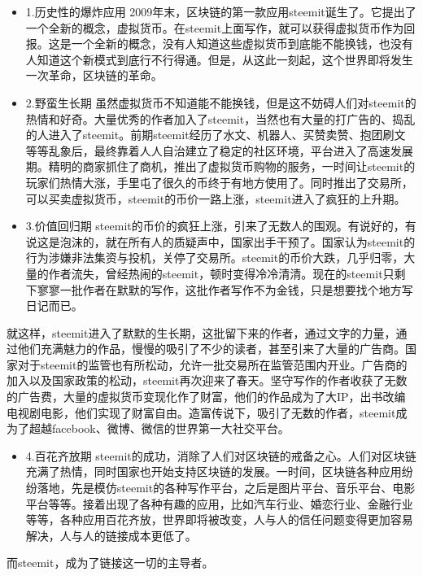 \documentclass[]{ctexbook}
\providecommand{\tightlist}{%
  \setlength{\itemsep}{0pt}\setlength{\parskip}{0pt}}
\begin{document}
\begin{itemize}
\item
  1.历史性的爆炸应用
  2009年末，区块链的第一款应用steemit诞生了。它提出了一个全新的概念，虚拟货币。在steemit上面写作，就可以获得虚拟货币作为回报。这是一个全新的概念，没有人知道这些虚拟货币到底能不能换钱，也没有人知道这个新模式到底行不行得通。但是，从这此一刻起，这个世界即将发生一次革命，区块链的革命。
\item
  2.野蛮生长期
  虽然虚拟货币不知道能不能换钱，但是这不妨碍人们对steemit的热情和好奇。大量优秀的作者加入了steemit，当然也有大量的打广告的、捣乱的人进入了steemit。前期steemit经历了水文、机器人、买赞卖赞、抱团刷文等等乱象后，最终靠着人人自治建立了稳定的社区环境，平台进入了高速发展期。精明的商家抓住了商机，推出了虚拟货币购物的服务，一时间让steemit的玩家们热情大涨，手里屯了很久的币终于有地方使用了。同时推出了交易所，可以买卖虚拟货币，steemit的币价一路上涨，steemit进入了疯狂的上升期。
\item
  3.价值回归期
  steemit的币价的疯狂上涨，引来了无数人的围观。有说好的，有说这是泡沫的，就在所有人的质疑声中，国家出手干预了。国家认为steemit的行为涉嫌非法集资与投机，关停了交易所。steemit的币价大跌，几乎归零，大量的作者流失，曾经热闹的steemit，顿时变得冷冷清清。现在的steemit只剩下寥寥一批作者在默默的写作，这批作者写作不为金钱，只是想要找个地方写日记而已。
\end{itemize}

就这样，steemit进入了默默的生长期，这批留下来的作者，通过文字的力量，通过他们充满魅力的作品，慢慢的吸引了不少的读者，甚至引来了大量的广告商。国家对于steemit的监管也有所松动，允许一批交易所在监管范围内开业。广告商的加入以及国家政策的松动，steemit再次迎来了春天。坚守写作的作者收获了无数的广告费，大量的虚拟货币变现化作了财富，他们的作品成为了大IP，出书改编电视剧电影，他们实现了财富自由。造富传说下，吸引了无数的作者，steemit成为了超越facebook、微博、微信的世界第一大社交平台。

\begin{itemize}
\tightlist
\item
  4.百花齐放期
  steemit的成功，消除了人们对区块链的戒备之心。人们对区块链充满了热情，同时国家也开始支持区块链的发展。一时间，区块链各种应用纷纷落地，先是模仿steemit的各种写作平台，之后是图片平台、音乐平台、电影平台等等。接着出现了各种有趣的应用，比如汽车行业、婚恋行业、金融行业等等，各种应用百花齐放，世界即将被改变，人与人的信任问题变得更加容易解决，人与人的链接成本更低了。
\end{itemize}

而steemit，成为了链接这一切的主导者。
\end{document}
